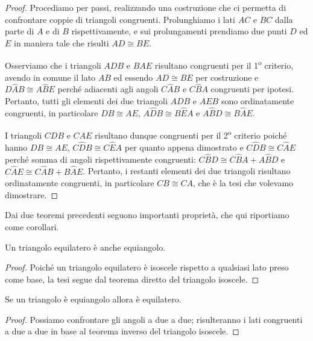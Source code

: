 \begin{proof}
Procediamo per passi, realizzando una costruzione che ci permetta di confrontare coppie di triangoli congruenti. Prolunghiamo i lati $AC$ e $BC$ dalla parte di $A$ e di $B$ rispettivamente, e sui prolungamenti prendiamo due punti $D$ ed $E$ in maniera tale che risulti $AD\cong BE$.

Osserviamo che i triangoli $ADB$ e $BAE$ risultano congruenti per il 1\textsuperscript{o} criterio, avendo in comune il lato $AB$  ed essendo $AD\cong BE$ per costruzione e $D\widehat{A}B\cong A\widehat{B}E$ perché adiacenti agli angoli $C\widehat{A}B$ e $C\widehat{B}A$ congruenti per ipotesi. Pertanto, tutti gli elementi dei due triangoli $ADB$ e $AEB$ sono ordinatamente congruenti, in particolare $DB\cong AE$, $A\widehat{D}B\cong B\widehat{E}A$ e $A\widehat{B}D\cong B\widehat{A}E$.

I triangoli $CDB$ e $CAE$ risultano dunque congruenti per il 2\textsuperscript{o} criterio poiché hanno $DB\cong AE$, $C\widehat{D}B\cong C\widehat{E}A$ per quanto appena dimostrato e $C\widehat{D}B\cong C\widehat{A}E$ perché somma di angoli rispettivamente congruenti: $C\widehat{B}D\cong C\widehat{B}A + A\widehat{B}D$ e $C\widehat{A}E\cong C\widehat{A}B + B\widehat{A}E$.
Pertanto, i restanti elementi dei due triangoli risultano ordinatamente congruenti, in particolare $CB\cong CA$, che è la tesi che volevamo dimostrare.
\end{proof}


Dai due teoremi precedenti seguono importanti proprietà, che qui riportiamo come corollari.

\begin{corollario}
Un triangolo equilatero è anche equiangolo.
\end{corollario}

\begin{proof}
Poiché un triangolo equilatero è isoscele rispetto a qualsiasi lato preso come base, la tesi segue dal teorema diretto del triangolo isoscele.
\end{proof}

\begin{corollario}
Se un triangolo è equiangolo allora è equilatero.
\end{corollario}

\begin{proof}
Possiamo confrontare gli angoli a due a due; risulteranno i lati congruenti a due a due in base al teorema inverso del triangolo isoscele.
\end{proof}


